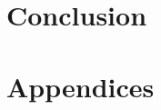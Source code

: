 \documentclass[a4paper,12pt,twocolumn]{article}
\begin{document}
\section{Conclusion}
	

\newpage
\begin{thebibliography}{}
	
	
\end{thebibliography}

	

\newpage

\section*{Appendices}
	
	
\end{document}
